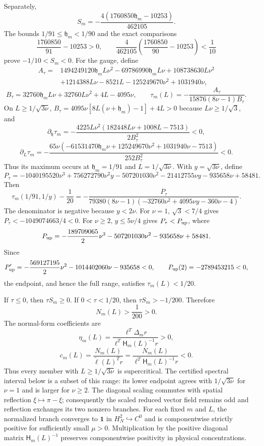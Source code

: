 Separately,
\[
 S_m=-\frac{4(1760850\mathfrak h_m-10253)}{462105}.
\]
The bounds $1/91\le\mathfrak h_m<1/90$ and the exact comparisons
\[
 \frac{1760850}{91}-10253>0,
 \qquad
 \frac4{462105}\left(\frac{1760850}{90}-10253\right)<\frac1{10}
\]
prove $-1/10<S_m<0$.  For the gauge, define
\begin{align*}
A_\tau={}&1494249120\mathfrak h_mL\nu^2-69786990\mathfrak h_mL\nu
+108738630L\nu^2\\
&+1214388L\nu-8521L-125249670\nu^2+1031940\nu,
\end{align*}
\[
B_\tau=32760\mathfrak h_mL\nu+32760L\nu^2+4L-4095\nu,
\qquad
\tau_m(L)=-\frac{A_\tau}{15876(8\nu-1)B_\tau}.
\]
On $L\ge1/\sqrt{3\nu}$,
$B_\tau=4095\nu[8L(\nu+\mathfrak h_m)-1]+4L>0$ because
$L\nu\ge1/\sqrt3$, and
\[
\partial_{\mathfrak h}\tau_m
=-\frac{4225L\nu^2(182448L\nu+1008L-7513)}{2B_\tau^2}<0,
\]
\[
\partial_L\tau_m
=-\frac{65\nu(-61531470\mathfrak h_m\nu+125249670\nu^2
+1031940\nu-7513)}{252B_\tau^2}<0.
\]
Thus its maximum occurs at $\mathfrak h_m=1/91$ and
$L=1/\sqrt{3\nu}$.  With $y=\sqrt{3\nu}$, define
\[
P_\tau=-1040195520\nu^3+756272790\nu^2y-507201030\nu^2
-21412755\nu y-935658\nu+58481.
\]
Then
\[
\tau_m(1/91,1/y)-\frac1{20}
=-\frac{P_\tau}{79380(8\nu-1)
(-32760\nu^2+4095\nu y-360\nu-4)}.
\]
The denominator is negative because $y<2\nu$.
For $\nu=1$, $\sqrt3<7/4$ gives
$P_\tau<-1049074663/4<0$.  For $\nu\ge2$, $y\le5\nu/4$ gives
$P_\tau<P_{\rm up}$, where
\[
P_{\rm up}=-\frac{189709065}{2}\nu^3-507201030\nu^2-935658\nu+58481.
\]
Since
\[
P_{\rm up}'=-\frac{569127195}{2}\nu^2-1014402060\nu-935658<0,
\qquad P_{\rm up}(2)=-2789453215<0,
\]
the endpoint, and hence the full range, satisfies $\tau_m(L)<1/20$.

If $\tau\le0$, then $\tau S_m\ge0$.  If $0<\tau<1/20$, then
$\tau S_m>-1/200$.  Therefore
\[
 N_m(L)>\frac1{200}>0.
\]
The normal-form coefficients are
\[
 \eta_m(L)=\frac{\ell^T\Delta_m r}
 {\ell^T\mathsf H_m(L)^{-1}r}>0,
\]
\[
 c_m(L)=\frac{N_m(L)}{\widetilde\ell(L)^Tr}
 =\frac{N_m(L)}{\ell^T\mathsf H_m(L)^{-1}r}<0.
\]
Thus every member with $L\ge1/\sqrt{3\nu}$ is supercritical.  The certified
spectral interval below is a subset of this range: its lower endpoint agrees
with $1/\sqrt{3\nu}$ for $\nu=1$ and is larger for $\nu\ge2$.
The diagonal scaling commutes with spatial reflection
$\xi\mapsto\pi-\xi$; consequently the scaled reduced vector field remains
odd and reflection exchanges its two nonzero branches.
For each fixed $m$ and $L$, the normalized branch converges to $\mathbf1$ in
$H_N^2\hookrightarrow C^0$ and is componentwise strictly positive for
sufficiently small $\mu>0$.  Multiplication by the positive diagonal matrix
$\mathsf H_m(L)^{-1}$ preserves componentwise positivity in physical
concentrations.


